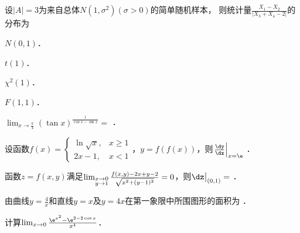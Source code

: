 \documentclass[plain,noanswer,medmath]{../../template/jnuexam}
\begin{document}
\begin{problem}
设$|A| = 3$为来自总体$N\left(1,\sigma^2 \right)\left(\sigma > 0 \right)$的简单随机样本，
则统计量$\frac{X_1 - X_2}{\left| X_3 + X_4 - 2 \right|}$的分布为\pickout{}
\begin{abcd}
\item $N\left(0,1 \right)$．
\item $t(1)$．
\item $\chi^2(1)$．
\item $F\left(1,1 \right)$．
\end{abcd}
\end{problem}




\begin{problem}
$\lim_{x \to \frac{\pi}{4}} \left(\tan x \right)^{\frac{1}{\cos x - \sin x}} =$ \fillin{}．
\end{problem}


\begin{problem}
设函数$f(x) = \begin{cases}
  \ln \sqrt{x} , & x \ge 1 \\
         2x - 1, & x < 1
\end{cases}$，$y=f(f(x))$，则$\left.\frac{\dy}{\dx}\right|_{x=\e}$ \fillin{}．
\end{problem}


\begin{problem}
函数$z = f(x,y)$满足$\lim_{\begin{subarray}{l}
  x \to 0 \\
  y \to 1
\end{subarray}} \frac{f(x,y) - 2x + y - 2}{\sqrt{x^2 + (y - 1)^2}} = 0$，则$\dz\big|_{(0,1)} =$ \fillin{}．
\end{problem}


\begin{problem}
由曲线$y = \frac{4}{x}$和直线$y = x$及$y = 4x$在第一象限中所围图形的面积为 \fillin{}．
\end{problem}








\begin{problem}[points=10]
计算$\lim_{x \to 0} \frac{\e^{x^2} - \e^{2 - 2\cos x}}{x^4}$．
\end{problem}
\end{document}
